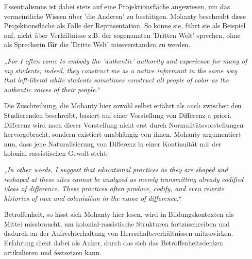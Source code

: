 \noindent Essentialismus ist dabei stets
auf eine Projektionsfläche angewiesen, um das vermeintliche Wissen über 'die
Anderen' zu bestätigen. Mohanty beschreibt diese Projektionsfläche als Falle
der Repräsentation\footnotemark{}. So könne sie, führt sie als Beispiel auf, nicht über
Verhältnisse z.B. der sogenannten 'Dritten Welt'\footnotemark{} sprechen, ohne als Sprecherin \textbf{für} die 'Dritte Welt' missverstanden
zu werden.
\begin{myenv}
  \textit{
  „For I often come to embody the 'authentic' authority and experience for many
  of my students; indeed, they construct me as a native informant in the same
  way that left-liberal white students sometimes construct all people of color
  as the authentic voices of their people.“\footnotemark {}
    }
\end{myenv}
Die Zuschreibung, die Mohanty hier sowohl selbst erfährt als auch zwischen den
Studierenden beschreibt, basiert auf einer Vorstellung von Differenz a priori.
Differenz wird nach dieser Vorstellung nicht erst durch
Normalitätsvorstellungen hervorgebracht, sondern existiert unabhängig von
ihnen. Mohanty argumentiert nun, dass jene Naturalisierung von Differenz in
einer Kontinuität mir der kolonial-rassistischen Gewalt steht:
\begin{myenv}
  \textit{
    „In other words, I suggest that educational practices as they are shaped
  and reshaped at these sites cannot be analyzed as merely transmitting already
codified ideas of difference. These practices often produce, codify, and even
rewrite histories of race and colonialism in the name of
difference.“\footnotemark {}
    }
\end{myenv}
Betroffenheit, so lässt sich Mohanty hier lesen, wird in Bildungskontexten als
Mittel missbraucht, um kolonial-rassistische Strukturen fortzuschreiben und
dadurch an der Aufrechterhaltung von Herrschaftsverhältnissen mitzuwirken.
Erfahrung dient dabei als Anker, durch das sich das Betroffenheitsdenken
artikulieren und festsetzen kann.\\

